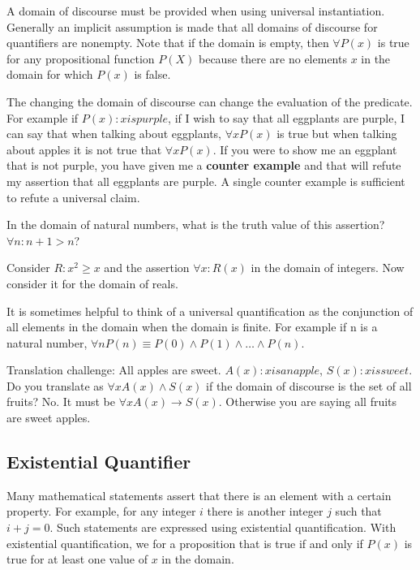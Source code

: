 \begin{notes}
A domain of discourse must be provided when using universal instantiation. Generally an implicit assumption is made that all domains of discourse for quantifiers are nonempty. Note that if the domain is empty, then $\forall P(x)$ is true for any propositional function $P(X)$ because there are no elements $x$ in the domain for which $P(x)$ is false. 
\end{notes}

The changing the domain of discourse can change the evaluation of the predicate. For example if $P(x): x is purple$, if I wish to say that all eggplants are purple, I can say that when talking about eggplants, $\forall x P(x)$ is true but when talking about apples it is not true that $\forall x P(x)$. If you were to show me an eggplant that is not purple, you have given me a \textbf{counter example} and that will refute my assertion that all eggplants are purple. A single counter example is sufficient to refute a universal claim.

In the domain of natural numbers, what is the truth value of this assertion? $\forall n: n+1 > n$?

Consider $R:x^2 \ge x$ and the assertion $\forall x: R(x)$ in the domain of integers. Now consider it for the domain of reals.

It is sometimes helpful to think of a universal quantification as the conjunction of all elements in the domain when the domain is finite. For example if n is a natural number, $\forall n P(n) \equiv P(0) \land P(1) \land \dots \land P(n)$.

Translation challenge: All apples are sweet. $A(x): x is an apple$, $S(x): x is sweet$. Do you translate as $\forall x A(x) \land S(x)$ if the domain of discourse is the set of all fruits? No. It must be $\forall x A(x) \rightarrow S(x)$. Otherwise you are saying all fruits are sweet apples. 


        \subsection {Existential Quantifier}
Many mathematical statements assert that there is an element with a certain property. For example, for any integer $i$ there is another integer $j$ such that $i+j=0$. Such statements are expressed using existential quantification. With existential quantification, we for a proposition that is true if and only if $P(x)$ is true for at least one value of $x$ in the domain.

